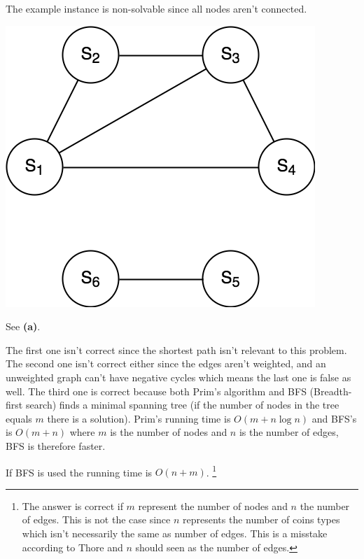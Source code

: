 \documentclass[a4paper]{article}
\newenvironment{task}[1]
{
	\begin{description}[align=right]
		\item [#1]
}{		%
	\end{description}
}
\newcommand{\taskref}[1]{\textbf{#1}}
\DeclareMathOperator{\*}{\cdot}
\begin{document}
\begin{task}{(b)}
	\qquad The example instance is non-solvable since all nodes aren't connected. 
	
	\includegraphics[scale=0.3]{130529-4b.png}
\end{task}

\begin{task}{(c)}
	 See \taskref{(a)}.
\end{task}

\begin{task}{(d)}
	 The first one isn't correct since the shortest path isn't relevant to this problem. The second one isn't correct either since the edges aren't weighted, and an unweighted graph can't have negative cycles which means the last one is false as well. The third one is correct because both Prim's algorithm and BFS (Breadth-first search) finds a minimal spanning tree (if the number of nodes in the tree equals $m$ there is a solution). Prim's running time is $O(m+n \log n)$ and BFS's is $O(m+n)$ where $m$ is the number of nodes and $n$ is the number of edges, BFS is therefore faster.
\end{task}

\begin{task}{(e)}
	 If BFS is used the running time is $O(n+m)$. \footnote{The answer is correct if $m$ represent the number of nodes and $n$ the number of edges. This is not the case since $n$ represents the number of coins types which isn't necessarily the same as number of edges. This is a misstake according to Thore and $n$ should seen as the number of edges.}
\end{task}
\end{document}
